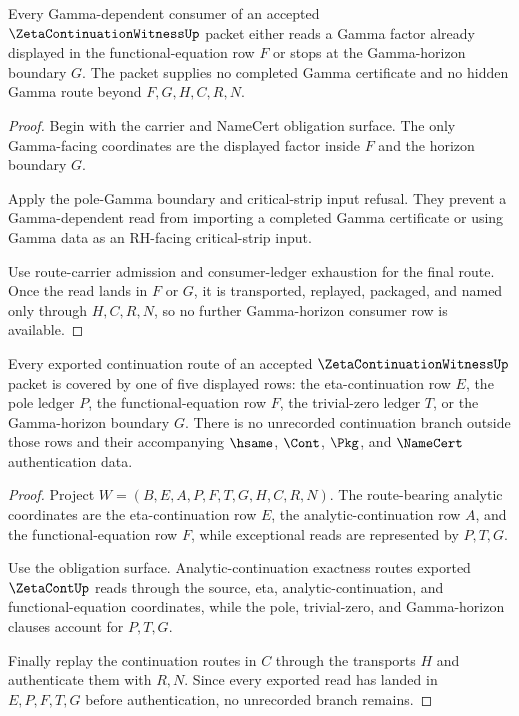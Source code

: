 \begin{theorem}
\label{thm:zeta-continuation-witness-gamma-horizon-consumer-row}
Every Gamma-dependent consumer of an accepted $\ZetaContinuationWitnessUp$ packet either reads a Gamma factor already displayed in the functional-equation row $F$ or stops at the Gamma-horizon boundary $G$. The packet supplies no completed Gamma certificate and no hidden Gamma route beyond $F,G,H,C,R,N$.
\end{theorem}
\begin{proof}
Begin with the carrier and NameCert obligation surface. The only Gamma-facing coordinates are the displayed factor inside $F$ and the horizon boundary $G$.

Apply the pole-Gamma boundary and critical-strip input refusal. They prevent a Gamma-dependent read from importing a completed Gamma certificate or using Gamma data as an RH-facing critical-strip input.

Use route-carrier admission and consumer-ledger exhaustion for the final route. Once the read lands in $F$ or $G$, it is transported, replayed, packaged, and named only through $H,C,R,N$, so no further Gamma-horizon consumer row is available.
\end{proof}

\begin{theorem}
\label{thm:zeta-continuation-witness-eta-functional-route-coverage}
Every exported continuation route of an accepted $\ZetaContinuationWitnessUp$ packet is covered by one of five displayed rows: the eta-continuation row $E$, the pole ledger $P$, the functional-equation row $F$, the trivial-zero ledger $T$, or the Gamma-horizon boundary $G$. There is no unrecorded continuation branch outside those rows and their accompanying $\hsame$, $\Cont$, $\Pkg$, and $\NameCert$ authentication data.
\end{theorem}
\begin{proof}
Project $W=(B,E,A,P,F,T,G,H,C,R,N)$. The route-bearing analytic coordinates are the eta-continuation row $E$, the analytic-continuation row $A$, and the functional-equation row $F$, while exceptional reads are represented by $P,T,G$.

Use the obligation surface. Analytic-continuation exactness routes exported $\ZetaContUp$ reads through the source, eta, analytic-continuation, and functional-equation coordinates, while the pole, trivial-zero, and Gamma-horizon clauses account for $P,T,G$.

Finally replay the continuation routes in $C$ through the transports $H$ and authenticate them with $R,N$. Since every exported read has landed in $E,P,F,T,G$ before authentication, no unrecorded branch remains.
\end{proof}

